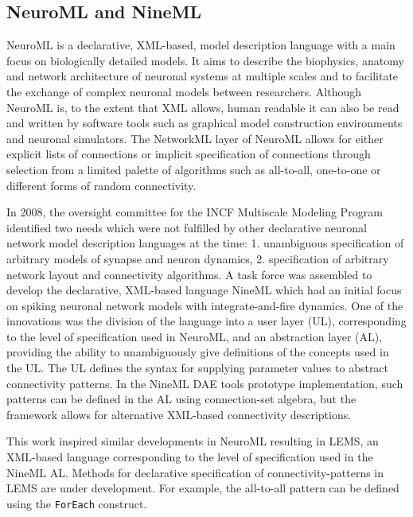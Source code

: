\documentclass{frontiersSCNS} %
\begin{document}
\subsection{NeuroML and NineML}
NeuroML \citep{gleeson10,goddard01} is a declarative, XML-based, model
description language with a main focus on biologically detailed
models. It aims to describe the biophysics, anatomy and network
architecture of neuronal systems at multiple scales and to facilitate
the exchange of complex neuronal models between researchers. Although
NeuroML is, to the extent that XML allows, human readable it can also
be read and written by software tools such as
graphical model construction environments \citep{gleeson07} and
neuronal simulators. The NetworkML layer of NeuroML allows for either
explicit lists of connections or implicit specification of connections
through selection from a limited palette of algorithms such as
all-to-all, one-to-one or different forms of random connectivity.

In 2008, the oversight committee for the INCF Multiscale Modeling
Program identified two needs which were not fulfilled by other
declarative neuronal network model description languages at the time:
1. unambiguous specification of arbitrary models of synapse and neuron
dynamics, 2. specification of arbitrary network layout and
connectivity algorithms.  A task force was assembled to develop the
declarative, XML-based language NineML \citep{raikov11} which had an
initial focus on spiking neuronal network models with
integrate-and-fire dynamics.  One of the innovations was the division
of the language into a user layer (UL), corresponding to the level of
specification used in NeuroML, and an abstraction layer (AL),
providing the ability to unambiguously give definitions of the
concepts used in the UL. The UL defines the syntax for supplying
parameter values to abstract connectivity patterns. In the NineML DAE
tools prototype implementation, such patterns can be defined in the AL
using connection-set algebra, but the framework allows for alternative
XML-based connectivity descriptions.

This work inspired similar developments in NeuroML resulting in LEMS,
an XML-based language corresponding to the level of specification used
in the NineML AL.  Methods for declarative specification of
connectivity-patterns in LEMS are under development.  For example, the
all-to-all pattern can be defined using the \verb|ForEach| construct.
\end{document}
